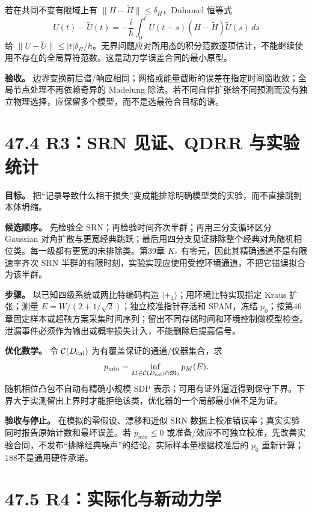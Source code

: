 \documentclass[
  11pt,
  oneside]{book}
\begin{document}
若在共同不变有限域上有 \(\|H-\widetilde H\|\le\delta_H\)，Duhamel 恒等式
\[
U(t)-\widetilde U(t)
=-\frac{i}{\hbar}\int_0^tU(t-s)(H-\widetilde H)\widetilde U(s)\,ds
\] 给
\(\|U-\widetilde U\|\le |t|\delta_H/\hbar\)。无界问题应对所用态的积分范数逐项估计，不能继续使用不存在的全局算符范数。这是动力学误差合同的最小原型。

\textbf{验收。}
边界变换前后谱/响应相同；网格或能量截断的误差在指定时间窗收敛；全局节点处理不再依赖奇异的
Madelung
除法。若不同自伴扩张给不同预测而没有独立物理选择，应保留多个模型，而不是选最符合目标的谱。

\hypertarget{r3srn-ux89c1ux8bc1qdrr-ux4e0eux5b9eux9a8cux7edfux8ba1}{%
\section{47.4 R3：SRN 见证、QDRR
与实验统计}\label{r3srn-ux89c1ux8bc1qdrr-ux4e0eux5b9eux9a8cux7edfux8ba1}}

\textbf{目标。}
把``记录导致什么相干损失''变成能排除明确模型类的实验，而不直接跳到本体坍缩。

\textbf{候选顺序。} 先检验全 SRN；再检验时间齐次半群；再用三分支循环区分
Gaussian
对角扩散与更宽经典跳跃；最后用四分支见证排除整个经典对角随机相位类。每一级都有更宽的未排除类。第39章
\(K_*\) 有零元，因此其精确通道不是有限速率齐次 SRN
半群的有限时刻，实验实现应使用受控环境通道，不把它错误拟合为该半群。

\textbf{步骤。} 以已知四级系统或两比特编码构造
\(|+_4\rangle\)；用环境比特实现指定 Kraus 扩张；测量
\(E=W/(2+1/\sqrt2)\)；独立校准指针存活和 SPAM，冻结
\(p_0\)；按第46章固定样本或超鞅方案采集时间序列；留出不同存储时间和环境控制做模型检查。泄漏事件必须作为输出或概率损失计入，不能删除后提高信号。

\textbf{优化数学。} 令 \(\mathcal C(D_{\rm cal})\)
为有覆盖保证的通道/仪器集合，求 \[
p_{\min}=\inf_{M\in\mathcal C(D_{\rm cal})\cap\mathfrak M_0}p_M(E).
\] 随机相位凸包不自动有精确小规模 SDP
表示；可用有证外逼近得到保守下界。下界大于实测留出上界时才能拒绝该类，优化器的一个局部最小值不足为证。

\textbf{验收与停止。} 在模拟的零假设、漂移和近似 SRN
数据上校准错误率；真实实验同时报告原始计数和最坏误差。若
\(p_{\min}\le0\)
或准备/效应不可独立校准，先改善实验合同，不发布``排除经典噪声''的结论。实际样本量根据校准后的
\(p_0\) 重新计算；188不是通用硬件承诺。

\hypertarget{r4ux5b9eux9645ux5316ux4e0eux65b0ux52a8ux529bux5b66}{%
\section{47.5
R4：实际化与新动力学}\label{r4ux5b9eux9645ux5316ux4e0eux65b0ux52a8ux529bux5b66}}
\end{document}
